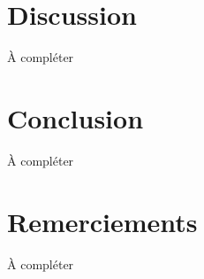 \documentclass{article}
\begin{document}
  \section{Discussion}
  \label{sec:discussion}
  À compléter


  \section{Conclusion}
  À compléter

  \section*{Remerciements}
  À compléter

  
  
\end{document}
